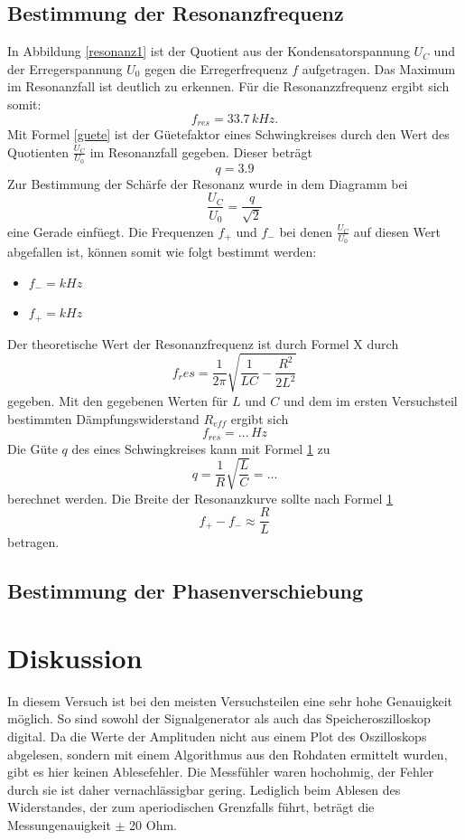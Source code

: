 \documentclass[11pt,ngerman,a4paper]{article}
\begin{document}
\subsection{Bestimmung der Resonanzfrequenz}
In Abbildung \ref{resonanz1} ist der Quotient aus der Kondensatorspannung $U_C$ und der Erregerspannung $U_0$ gegen die Erregerfrequenz $f$ aufgetragen. Das Maximum im Resonanzfall ist deutlich zu erkennen. F\"ur die Resonanzzfrequenz ergibt sich somit:
\[
	f_{res} = 33.7\,kHz.
\]
Mit Formel \ref{guete} ist der G\"uetefaktor eines Schwingkreises durch den Wert des Quotienten $\frac{U_C}{U_0}$ im Resonanzfall gegeben. Dieser betr\"agt
\[
q =  3.9
\]
Zur Bestimmung der Sch\"arfe der Resonanz wurde in dem Diagramm bei 
\[
\frac{U_C}{U_0} = \frac{q}{\sqrt{2}}
\]
eine Gerade einf\"uegt. Die Frequenzen $f_+$ und $f_-$ bei denen $\frac{U_C}{U_0}$ auf diesen Wert abgefallen ist, k\"onnen somit wie folgt bestimmt werden:
\begin{itemize}
\item $f_- = kHz$
\item $f_+ = kHz$
\end{itemize}

\noindent
Der theoretische Wert der Resonanzfrequenz ist durch Formel X durch
\[
f_res = \frac1{2\pi} \sqrt{\frac{1}{LC}-\frac{R^2}{2L^2}}
\]
gegeben. Mit den gegebenen Werten f\"ur $L$ und $C$ und dem im ersten Versuchsteil bestimmten D\"ampfungswiderstand
$R_{eff}$ ergibt sich 
\[
f_{res} = ...\,Hz
\]
Die G\"ute $q$ des eines Schwingkreises kann mit Formel \ref{} zu
\[
q = \frac{1}{R} \sqrt{\frac{L}{C}} = ... 
\]
berechnet werden. Die Breite der Resonanzkurve sollte nach Formel \ref{}
\[
f_+ - f_- \approx \frac{R}{L}
\]
betragen.
\subsection{Bestimmung der Phasenverschiebung}
\section{Diskussion}
In diesem Versuch ist bei den meisten Versuchsteilen eine sehr hohe Genauigkeit möglich. So sind sowohl der Signalgenerator als auch das Speicheroszilloskop digital. Da die Werte der Amplituden nicht aus einem Plot des Oszilloskops abgelesen, sondern mit einem Algorithmus aus den Rohdaten ermittelt wurden, gibt es hier keinen Ablesefehler. Die Messfühler waren hochohmig, der Fehler durch sie ist daher vernachlässigbar gering. Lediglich beim Ablesen des Widerstandes, der zum aperiodischen Grenzfalls führt, beträgt die Messungenauigkeit $\pm$ 20 Ohm.
\end{document}
